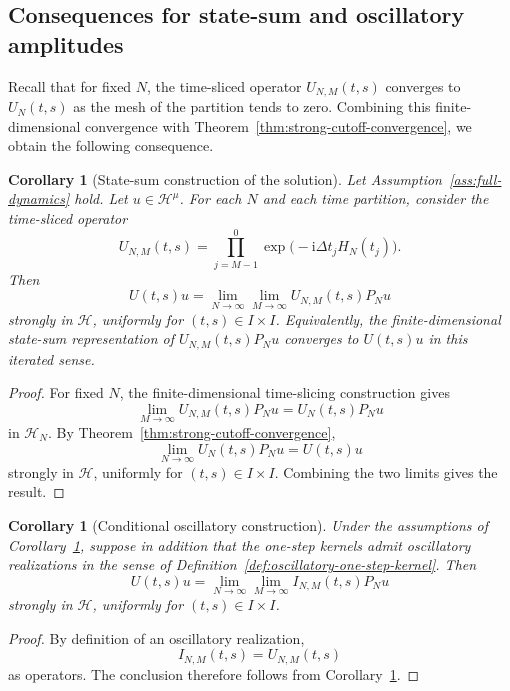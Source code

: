 \documentclass[10pt,a4paper]{amsart}
\newtheorem{corollary}[theorem]{Corollary}
\newcommand{\Hilb}{\mathcal H}
\newcommand{\ii}{\mathrm i}
\begin{document}
\subsection{Consequences for state-sum and oscillatory amplitudes}

Recall that for fixed \(N\), the time-sliced operator \(U_{N,M}(t,s)\)
converges to \(U_N(t,s)\) as the mesh of the partition tends to zero.
Combining this finite-dimensional convergence with
Theorem~\ref{thm:strong-cutoff-convergence}, we obtain the following
consequence.

\begin{corollary}[State-sum construction of the solution]
\label{cor:state-sum-construction}
Let Assumption~\ref{ass:full-dynamics} hold.  Let \(u\in\Hilb^\mu\).
For each \(N\) and each time partition, consider the time-sliced operator
\[
        U_{N,M}(t,s)
        =
        \prod_{j=M-1}^{0}
        \exp\bigl(-\ii\Delta t_jH_N(t_j)\bigr).
\]
Then
\[
        U(t,s)u
        =
        \lim_{N\to\infty}
        \lim_{M\to\infty}
        U_{N,M}(t,s)P_Nu
\]
strongly in \(\Hilb\), uniformly for \((t,s)\in I\times I\).
Equivalently, the finite-dimensional state-sum representation of
\(U_{N,M}(t,s)P_Nu\) converges to \(U(t,s)u\) in this iterated sense.
\end{corollary}

\begin{proof}
For fixed \(N\), the finite-dimensional time-slicing construction gives
\[
        \lim_{M\to\infty}
        U_{N,M}(t,s)P_Nu
        =
        U_N(t,s)P_Nu
\]
in \(\Hilb_N\).  By Theorem~\ref{thm:strong-cutoff-convergence},
\[
        \lim_{N\to\infty}
        U_N(t,s)P_Nu
        =
        U(t,s)u
\]
strongly in \(\Hilb\), uniformly for \((t,s)\in I\times I\).  Combining
the two limits gives the result.
\end{proof}

\begin{corollary}[Conditional oscillatory construction]
\label{cor:oscillatory-construction}
Under the assumptions of
Corollary~\ref{cor:state-sum-construction}, suppose in addition that the
one-step kernels admit oscillatory realizations in the sense of
Definition~\ref{def:oscillatory-one-step-kernel}. Then
\[
 U(t,s)u
 =
 \lim_{N\to\infty}\lim_{M\to\infty}
 I_{N,M}(t,s)P_Nu
\]
strongly in \(\Hilb\), uniformly for \((t,s)\in I\times I\).
\end{corollary}

\begin{proof}
By definition of an oscillatory realization,
\[
 I_{N,M}(t,s)=U_{N,M}(t,s)
\]
as operators. The conclusion therefore follows from
Corollary~\ref{cor:state-sum-construction}.
\end{proof}
\end{document}
